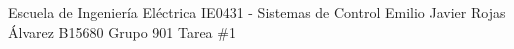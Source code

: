 \documentclass{ucrEieTarea}
\begin{document}
    {Escuela de Ingeniería Eléctrica}
    {IE0431 - Sistemas de Control}
    {Emilio Javier Rojas Álvarez}
    {B15680}
    {Grupo 901}
    {Tarea \#1}
  
  

  
  
  
  
  

  
\end{document}
